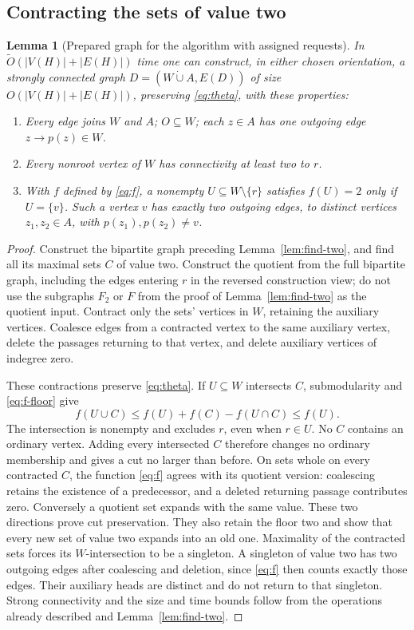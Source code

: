 \documentclass[11pt]{article}
\newtheorem{lemma}[theorem]{Lemma}
\theoremstyle{definition}
\theoremstyle{remark}
\newcommand{\OO}{\widetilde O}
\begin{document}
\subsection{Contracting the sets of value two}
\begin{lemma}[Prepared graph for the algorithm with assigned requests]
\label{lem:three-form}
In \(\OO(|V(H)|+|E(H)|)\) time one can construct, in either chosen orientation, a strongly connected graph \(D=(W\dot\cup A,E(D))\) of size \(O(|V(H)|+|E(H)|)\), preserving \eqref{eq:theta}, with these properties:
\begin{enumerate}
\item Every edge joins \(W\) and \(A\); \(O\subseteq W\); each \(z\in A\) has one outgoing edge \(z\to p(z)\in W\).
\item Every nonroot vertex of \(W\) has connectivity at least two to \(r\).
\item With \(f\) defined by \eqref{eq:f}, a nonempty \(U\subseteq W\setminus\{r\}\) satisfies \(f(U)=2\) only if \(U=\{v\}\). Such a vertex \(v\) has exactly two outgoing edges, to distinct vertices \(z_1,z_2\in A\), with \(p(z_1),p(z_2)\ne v\).
\end{enumerate}
\end{lemma}
\begin{proof}
Construct the bipartite graph preceding Lemma~\ref{lem:find-two}, and find all its maximal sets \(C\) of value two. Construct the quotient from the full bipartite graph, including the edges entering \(r\) in the reversed construction view; do not use the subgraphs \(F_2\) or \(F\) from the proof of Lemma~\ref{lem:find-two} as the quotient input. Contract only the sets' vertices in \(W\), retaining the auxiliary vertices. Coalesce edges from a contracted vertex to the same auxiliary vertex, delete the passages returning to that vertex, and delete auxiliary vertices of indegree zero.

These contractions preserve \eqref{eq:theta}. If \(U\subseteq W\) intersects \(C\), submodularity and \eqref{eq:f-floor} give
\begin{equation}
 f(U\cup C)\le f(U)+f(C)-f(U\cap C)\le f(U).
 \label{eq:two-saturation}
\end{equation}
The intersection is nonempty and excludes \(r\), even when \(r\in U\). No \(C\) contains an ordinary vertex. Adding every intersected \(C\) therefore changes no ordinary membership and gives a cut no larger than before. On sets whole on every contracted \(C\), the function \eqref{eq:f} agrees with its quotient version: coalescing retains the existence of a predecessor, and a deleted returning passage contributes zero. Conversely a quotient set expands with the same value. These two directions prove cut preservation. They also retain the floor two and show that every new set of value two expands into an old one. Maximality of the contracted sets forces its \(W\)-intersection to be a singleton. A singleton of value two has two outgoing edges after coalescing and deletion, since \eqref{eq:f} then counts exactly those edges. Their auxiliary heads are distinct and do not return to that singleton. Strong connectivity and the size and time bounds follow from the operations already described and Lemma~\ref{lem:find-two}.
\end{proof}
\end{document}
